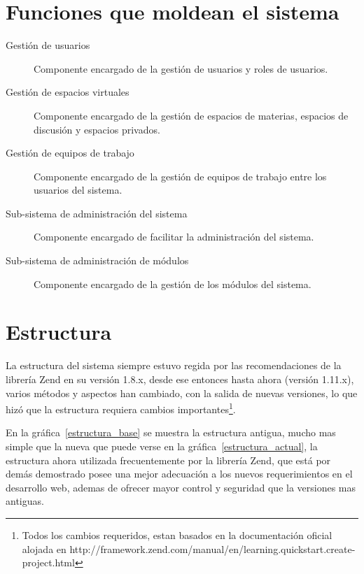 \section{Funciones que moldean el sistema}
\begin{description}
\item [Gestión de usuarios] Componente encargado de la gestión de usuarios y roles de usuarios.
\item [Gestión de espacios virtuales] Componente encargado de la gestión de espacios de materias, espacios de discusión
y espacios privados.
\item [Gestión de equipos de trabajo] Componente encargado de la gestión de equipos de trabajo entre los usuarios del
sistema.
\item [Sub-sistema de administración del sistema] Componente encargado de facilitar la administración del sistema.
\item [Sub-sistema de administración de módulos] Componente encargado de la gestión de los módulos del sistema.
\end{description}

\section{Estructura}
La estructura del sistema siempre estuvo regida por las recomendaciones de la librería Zend en su versión 1.8.x, desde
ese entonces hasta ahora (versión 1.11.x), varios métodos y aspectos han cambiado, con la salida de nuevas versiones, lo
que hizó que la estructura requiera cambios importantes\footnote{Todos los cambios requeridos, estan basados en la
documentación oficial alojada en http://framework.zend.com/manual/en/learning.quickstart.create-project.html}.

En la gráfica~\ref{estructura_base} se muestra la estructura antigua, mucho mas simple que la nueva que puede verse en la
gráfica~\ref{estructura_actual}, la estructura ahora utilizada frecuentemente por la librería Zend, que está por demás
demostrado posee una mejor adecuación a los nuevos requerimientos en el desarrollo web, ademas de ofrecer mayor control
y seguridad que la versiones mas antiguas\cite{Gilmore}.

